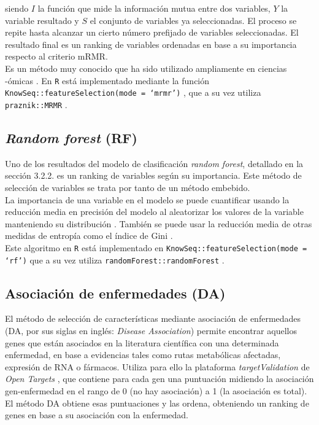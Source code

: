 siendo $I$ la función que mide la información mutua entre dos variables, $Y$ la variable resultado y $S$ el conjunto de variables ya seleccionadas. El proceso se repite hasta alcanzar un cierto número prefijado de variables seleccionadas. El resultado final es un ranking de variables ordenadas en base a su importancia respecto al criterio mRMR.\\

Es un método muy conocido que ha sido utilizado ampliamente en ciencias -ómicas \cite{Ding2005, Yang2013, Galvez2018, Castillo2019, Galvez2020}. En \texttt{R}  está implementado mediante la función \texttt{KnowSeq::\linebreak featureSelection(mode = `mrmr')} \cite{KnowSeq}, que a su vez utiliza \texttt{praznik::MRMR} \cite{Kursa2020}.

\subsection{\textit{Random forest} (RF)}

Uno de los resultados del modelo de clasificación \textit{random forest}, detallado en la sección 3.2.2. es un ranking de variables según su importancia. Este método de selección de variables se trata por tanto de un método embebido.\\

La importancia de una variable en el modelo se puede cuantificar usando la reducción media en precisión del modelo al aleatorizar los valores de la variable manteniendo su distribución \cite{Breiman2001, Breiman2002}. También se puede usar la reducción media de otras medidas de entropía como el índice de Gini \cite{Louppe2013}.\\

Este algoritmo en \texttt{R}  está implementado en \texttt{KnowSeq::featureSelection(mode = `rf')} \cite{KnowSeq} que a su vez utiliza \texttt{randomForest::randomForest} \cite{Liaw2002}.

\subsection{Asociación de enfermedades (DA)}

El método de selección de características mediante asociación de enfermedades (DA, por sus siglas en inglés: \textit{Disease Association}) permite encontrar aquellos genes que están asociados en la literatura científica con una determinada enfermedad, en base a evidencias tales como rutas metabólicas afectadas, expresión de RNA o fármacos. Utiliza para ello la plataforma \textit{targetValidation} de \textit{Open Targets} \cite{OpenTargets2020}, que contiene para cada gen una puntuación midiendo la asociación gen-enfermedad en el rango de 0 (no hay asociación) a 1 (la asociación es total). El método DA obtiene esas puntuaciones y las ordena, obteniendo un ranking de genes en base a su asociación con la enfermedad.\\

